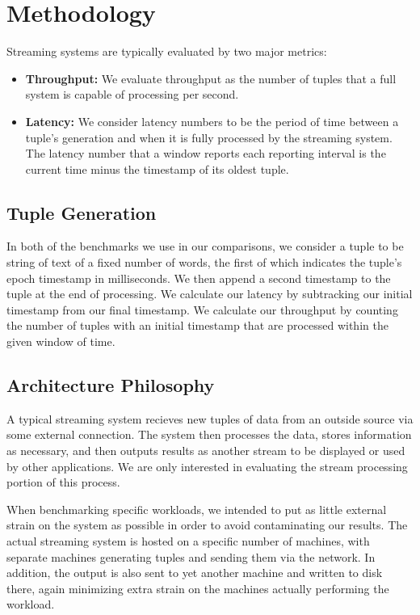 \section{Methodology}

Streaming systems are typically evaluated by two major metrics:
\begin{itemize}
\item \textbf{Throughput:} We evaluate throughput as the number of tuples that a full system is capable of processing per second.
\item \textbf{Latency:} We consider latency numbers to be the period of time between a tuple's generation and when it is fully processed by the streaming system.  The latency number that a window reports each reporting interval is the current time minus the timestamp of its oldest tuple.
\end{itemize}

\subsection{Tuple Generation}
In both of the benchmarks we use in our comparisons, we consider a tuple to be string of text of a fixed number of words, the first of which indicates the tuple's epoch timestamp in milliseconds.  We then append a second timestamp to the tuple at the end of processing.  We calculate our latency by subtracking our initial timestamp from our final timestamp.  We calculate our throughput by counting the number of tuples with an initial timestamp that are processed within the given window of time.

\subsection{Architecture Philosophy}
A typical streaming system recieves new tuples of data from an outside source via some external connection.  The system then processes the data, stores information as necessary, and then outputs results as another stream to be displayed or used by other applications.  We are only interested in evaluating the stream processing portion of this process.

When benchmarking specific workloads, we intended to put as little external strain on the system as possible in order to avoid contaminating our results.  The actual streaming system is hosted on a specific number of machines, with separate machines generating tuples and sending them via the network.  In addition, the output is also sent to yet another machine and written to disk there, again minimizing extra strain on the machines actually performing the workload.

